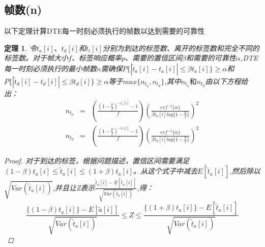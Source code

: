 \documentclass[UTF8]{ctexart}
\newtheorem{theorem}{定理}
\newtheorem*{proof}{证明}
\begin{document}
	\subsection{帧数(n)}
	
	以下定理计算DTE每一时刻必须执行的帧数以达到需要的可靠性
	\begin{theorem}
		令$t_a[i]、t_d[i]$和$t_t[i]$分别为到达的标签数、离开的标签数和完全不同的标签数。对于帧大小$f$、标签响应概率$p$、需要的置信区间$\beta$和需要的可靠性$\alpha$,DTE每一时刻必须执行的最小帧数$n$需确保$P\{|\widetilde{t}_a[i]-t_a[i]|\le \beta t_a[i]\}\ge \alpha$和$P\{|\widetilde{t}_d[i]-t_d[i]|\le \beta t_d[i]\}\ge \alpha$等于$max\{n_{t_a},n_{t_d}\}$,其中$n_{t_a}和n_{t_d}$由以下方程给出：
		\begin{eqnarray}
		n_{t_a}&=&\left(\frac{(1-\frac{p}{f})^{-t_i[i]}-1}{f}\right)\left(\frac{erf^{-1}\{\alpha\}}{\beta t_a[i]log\{1-\frac{p}{f}\}}\right)^2\label{twenty-one}\\
		n_{t_d}&=&\left(\frac{(1-\frac{p}{f})^{-t_t[i]}-1}{f}\right)\left(\frac{erf^{-1}\{\alpha\}}{\beta t_d[i]log\{1-\frac{p}{f}\}}\right)^2\label{twenty-two}
		\end{eqnarray}
		\begin{proof}
			对于到达的标签，根据问题描述，置信区间需要满足$(1-\beta)t_a[i]\le \widetilde{t}_a[i]\le  (1+\beta )t_a[i]$。从这个式子中减去$E[\widetilde{t}_a[i]]$,然后除以$\sqrt{Var(\widetilde{t}_a[i])}$,并且让Z表示$\frac{\widetilde{t}_a[i]-E[\widetilde{t}_a[i]]}{\sqrt{Var(\widetilde{t}_a[i])}}$,得：
			\begin{displaymath}
			\frac{\{(1-\beta)t_a[i]\}-E[\widetilde{a}[i]]}{\sqrt{Var(\widetilde{t}_a[i])}}\le Z \le \frac{\{(1+\beta)t_a[i]\}-E[\widetilde{t}_a[i]]}{\sqrt{Var(\widetilde{t}_a[i])}}
			\end{displaymath}
			

\end{proof}
\end{theorem}
\end{document}
